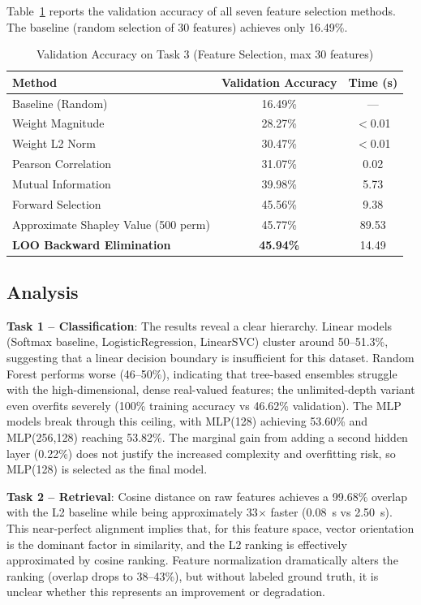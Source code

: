 \documentclass[onecolumn,a4paper,12pt]{IEEEtran}
\begin{document}
Table~\ref{tab:task3} reports the validation accuracy of all seven feature selection methods. The baseline (random selection of 30 features) achieves only 16.49\%.

\begin{table}[htbp]
\centering
\caption{Validation Accuracy on Task 3 (Feature Selection, max 30 features)}
\label{tab:task3}
\begin{tabular}{lcc}
\toprule
\textbf{Method} & \textbf{Validation Accuracy} & \textbf{Time (s)} \\
\midrule
Baseline (Random) & 16.49\% & --- \\
Weight Magnitude & 28.27\% & $<$0.01 \\
Weight L2 Norm & 30.47\% & $<$0.01 \\
Pearson Correlation & 31.07\% & 0.02 \\
Mutual Information & 39.98\% & 5.73 \\
Forward Selection & 45.56\% & 9.38 \\
Approximate Shapley Value (500 perm) & 45.77\% & 89.53 \\
\textbf{LOO Backward Elimination} & \textbf{45.94\%} & 14.49 \\
\bottomrule
\end{tabular}
\end{table}

\subsection{Analysis}

\textbf{Task 1 -- Classification}: The results reveal a clear hierarchy. Linear models (Softmax baseline, LogisticRegression, LinearSVC) cluster around 50--51.3\%, suggesting that a linear decision boundary is insufficient for this dataset. Random Forest performs worse (46--50\%), indicating that tree-based ensembles struggle with the high-dimensional, dense real-valued features; the unlimited-depth variant even overfits severely (100\% training accuracy vs 46.62\% validation). The MLP models break through this ceiling, with MLP(128) achieving 53.60\% and MLP(256,128) reaching 53.82\%. The marginal gain from adding a second hidden layer (0.22\%) does not justify the increased complexity and overfitting risk, so MLP(128) is selected as the final model.

\textbf{Task 2 -- Retrieval}: Cosine distance on raw features achieves a 99.68\% overlap with the L2 baseline while being approximately 33$\times$ faster (0.08~s vs 2.50~s). This near-perfect alignment implies that, for this feature space, vector orientation is the dominant factor in similarity, and the L2 ranking is effectively approximated by cosine ranking. Feature normalization dramatically alters the ranking (overlap drops to 38--43\%), but without labeled ground truth, it is unclear whether this represents an improvement or degradation.
\end{document}

